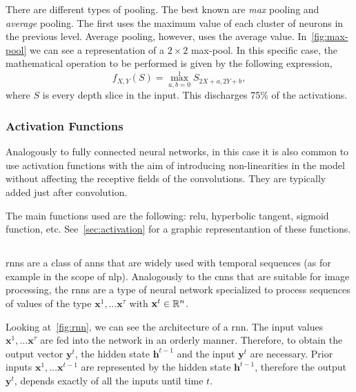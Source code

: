 There are different types of pooling. The best known are \emph{max} pooling and
\emph{average} pooling. The first uses the maximum value of each cluster of
neurons in the previous level. Average pooling, however, uses the average
value. In\ \vref{fig:max-pool} we can see a representation of a \(2 \times 2\)
max-pool. In this specific case, the mathematical operation to be performed is
given by the following expression,
\begin{equation}
  f_{X,Y}(S) = \max _{a,b=0}^{1}S_{2X+a,2Y+b},
\end{equation}
where \(S\) is every depth slice in the input. This discharges 75\% of the
activations.

\subsubsection{Activation Functions}

Analogously to fully connected neural networks, in this case it is also common
to use activation functions with the aim of introducing non-linearities in the
model without affecting the receptive fields of the convolutions. They are
typically added just after convolution.

The main functions used are the following: \gls{relu}, hyperbolic tangent,
sigmoid function, etc. See\ \vref{sec:activation} for a graphic representantion
of these functions.


\subsection{}\label{sec:rnn}

\Glspl{rnn} are a class of \glspl{ann} that are widely used with temporal
sequences (as for example in the scope of \gls{nlp}). Analogously to the
\glspl{cnn} that are suitable for image processing, the
\glspl{rnn} are a type of neural network specialized to process sequences of
values of the type \(\mathbf{x}^1, \ldots \mathbf{x}^{\tau}\) with
\(\mathbf{x}^t \in \mathbb{R}^n\).

Looking at\ \vref{fig:rnn}, we can see the architecture of a \gls{rnn}. The
input values \(\mathbf{x}^1, \ldots \mathbf{x}^\tau\) are fed into the network
in an orderly manner. Therefore, to obtain the output vector \(\mathbf{y}^t\),
the hidden state \(\mathbf{h}^{t - 1}\) and the input \(\mathbf{y}^{t}\) are
necessary. Prior inputs \(\mathbf{x}^1, \ldots \mathbf{x}^{t - 1}\) are
represented by the hidden state \(\mathbf{h}^{t - 1}\), therefore the output
\(\mathbf{y}^t\), depends exactly of all the inputs until time \(t\).

